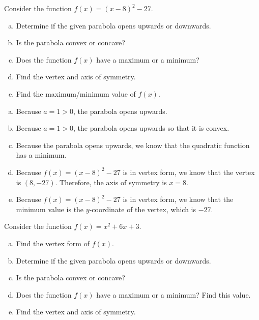 \documentclass[11pt,letterpaper]{article}
\begin{document}
\newpage



 Consider the function $f(x)= (x - 8)^2 - 27$. 
	\begin{enumerate}[(a)]
	\item Determine if the given parabola opens upwards or downwards.
	\item Is the parabola convex or concave?
	\item Does the function $f(x)$ have a maximum or a minimum?
	\item Find the vertex and axis of symmetry. 
	\item Find the maximum/minimum value of $f(x)$. 
	\end{enumerate} \pspace

\sol
\begin{enumerate}[(a)]
\item Because $a= 1 > 0$, the parabola opens upwards. \pspace

\item Because $a= 1 > 0$, the parabola opens upwards so that it is convex. \pspace

\item Because the parabola opens upwards, we know that the quadratic function has a minimum. \pspace

\item  Because $f(x)= (x - 8)^2 - 27$ is in vertex form, we know that the vertex is $(8, -27)$. Therefore, the axis of symmetry is $x= 8$. \pspace

\item Because $f(x)= (x - 8)^2 - 27$ is in vertex form, we know that the minimum value is the $y$-coordinate of the vertex, which is $-27$.
\end{enumerate}



\newpage



 Consider the function $f(x)= x^2 + 6x + 3$. 
	\begin{enumerate}[(a)]
	\item Find the vertex form of $f(x)$. 
	\item Determine if the given parabola opens upwards or downwards.
	\item Is the parabola convex or concave?
	\item Does the function $f(x)$ have a maximum or a minimum? Find this value.
	\item Find the vertex and axis of symmetry. 
	\end{enumerate} \pspace
\end{document}
